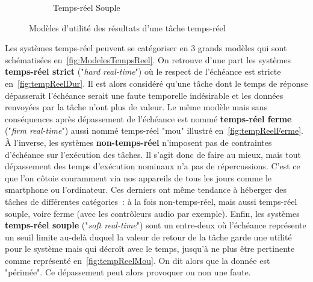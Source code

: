 \documentclass[french, a4paper, 11pt, twoside, pdftex]{StyleThese}
\begin{document}
\begin{figure}[ht!]
\begin{subfigure}{.3\textwidth}
				\caption[]{Temps-réel Souple}
				\label{fig:tempReelMou}
			\end{subfigure}
			\caption{Modèles d'utilité des résultats d'une tâche temps-réel}
			\label{fig:ModelesTempsReel}
		\end{figure}
	
		Les systèmes temps-réel peuvent se catégoriser en 3 grands modèles qui sont schématisées en~\autoref{fig:ModelesTempsReel}. On retrouve d'une part les systèmes \textbf{temps-réel strict} ("\textit{hard real-time}") où le respect de l'échéance est stricte en~\autoref{fig:tempReelDur}. Il est alors considéré qu'une tâche dont le temps de réponse dépasserait l'échéance serait une faute temporelle indésirable et les données renvoyées par la tâche n'ont plus de valeur. Le même modèle mais sans conséquences après dépassement de l'échéance est nommé \textbf{temps-réel ferme} ("\textit{firm real-time}") aussi nommé temps-réel "mou" illustré en~\autoref{fig:tempReelFerme}. À l'inverse, les systèmes \textbf{non-temps-réel} n'imposent pas de contraintes d'échéance sur l'exécution des tâches. Il s'agit donc de faire au mieux, mais tout dépassement des temps d'exécution nominaux n'a pas de répercussions. C'est ce que l'on côtoie couramment via nos appareils de tous les jours comme le smartphone ou l'ordinateur. Ces derniers ont même tendance à héberger des tâches de différentes catégories~: à la fois non-temps-réel, mais aussi temps-réel souple, voire ferme (avec les contrôleurs audio par exemple). Enfin, les systèmes \textbf{temps-réel souple} ("\textit{soft real-time}") sont un entre-deux où l'échéance représente un seuil limite au-delà duquel la valeur de retour de la tâche garde une utilité pour le système mais qui décroît avec le temps, jusqu'à ne plus être pertinente comme représenté en~\autoref{fig:tempReelMou}. On dit alors que la donnée est "périmée". Ce dépassement peut alors provoquer ou non une faute.
		
\end{document}
